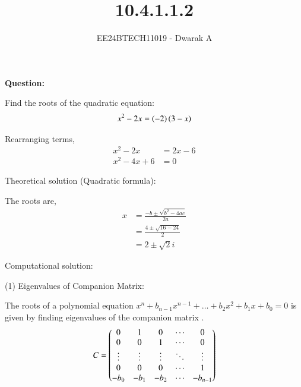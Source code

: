 \documentclass[journal]{IEEEtran}
\begin{document}

\vspace{3cm}

\title{10.4.1.1.2}
\author{EE24BTECH11019 - Dwarak A}
{\let\newpage\relax\maketitle}

\renewcommand{\thefigure}{\theenumi}
\renewcommand{\thetable}{\theenumi}
\setlength{\intextsep}{10pt} %


\renewcommand{\thetable}{\theenumi}

\textbf{Question:}

Find the roots of the quadratic equation:
\begin{align}
    x^2 - 2x = \left(-2\right)\left(3-x\right)
\end{align}

\solution

Rearranging terms,
\begin{align}
    x^2 - 2x &= 2x - 6 \\
    x^2 - 4x + 6 &= 0
\end{align}

Theoretical solution (Quadratic formula):

The roots are,
\begin{align}
    x &= \frac{-b\pm\sqrt{b^2 - 4ac}}{2a} \\
    &= \frac{4\pm\sqrt{16-24}}{2} \\
    &= 2\pm\sqrt{2}i
\end{align}

Computational solution:

(1) Eigenvalues of Companion Matrix:

The roots of a polynomial equation $x^n+b_{n-1}x^{n-1}+\dots+b_2x^2+b_1x+b_0 = 0$ is given by finding eigenvalues of the companion matrix .
\begin{align}
    C = \begin{pmatrix}0&1&0&\cdots&0\\ 0&0&1&\cdots&0\\ \vdots &\vdots &\vdots &\ddots&\vdots\\0&0&0&\cdots&1\\-b_0&-b_1&-b_2&\cdots&-b_{n-1}\end{pmatrix}
\end{align}
\end{document}
